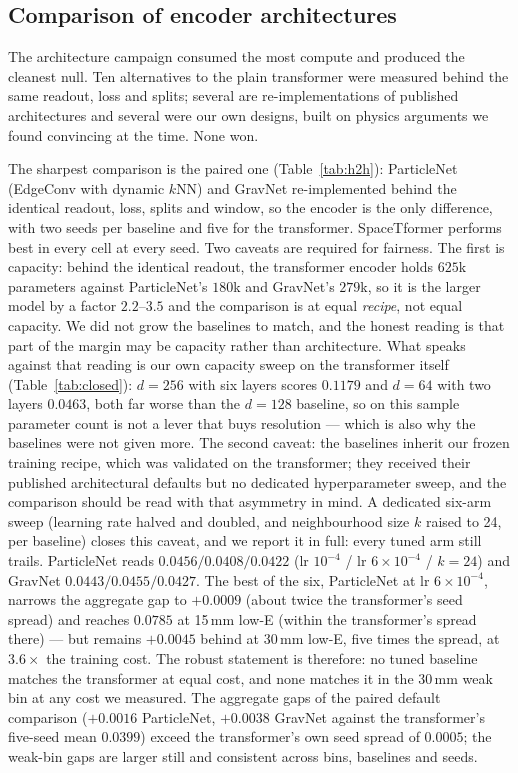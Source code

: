 \documentclass[11pt,a4paper]{article}
\begin{document}
\subsection{Comparison of encoder architectures}
\label{sec:encoders}

The architecture campaign consumed the most compute and produced the
cleanest null. Ten alternatives to the plain transformer were measured
behind the same readout, loss and splits; several are re-implementations of
published architectures and several were our own designs, built on physics
arguments we found convincing at the time. None won.

The sharpest comparison is the paired one (Table~\ref{tab:h2h}):
ParticleNet (EdgeConv with dynamic $k$NN) and GravNet re-implemented behind
the identical readout, loss, splits and window, so the encoder is the only
difference, with two seeds per baseline and five for the transformer.
SpaceTformer performs best in every cell at every seed. Two caveats are
required for fairness. The first is capacity: behind the identical readout,
the transformer encoder holds $625$k parameters against ParticleNet's $180$k
and GravNet's $279$k, so it is the larger model by a factor $2.2$--$3.5$ and
the comparison is at equal \emph{recipe}, not equal capacity. We did not
grow the baselines to match, and the honest reading is that part of the
margin may be capacity rather than architecture. What speaks against that
reading is our own capacity sweep on the transformer itself
(Table~\ref{tab:closed}): $d{=}256$ with six layers scores $0.1179$ and
$d{=}64$ with two layers $0.0463$, both far worse than the $d{=}128$
baseline, so on this sample parameter count is not a lever that buys
resolution --- which is also why the baselines were not given more.
The second caveat:
the baselines inherit our frozen training recipe, which was validated on
the transformer; they received their published architectural defaults but
no dedicated hyperparameter sweep, and the comparison should be read with
that asymmetry in mind. A dedicated six-arm sweep (learning rate halved and
doubled, and neighbourhood size $k$ raised to 24, per baseline) closes this
caveat, and we report it in full: every tuned arm still trails. ParticleNet
reads $0.0456 / 0.0408 / 0.0422$ (lr $10^{-4}$ / lr $6\times10^{-4}$ /
$k{=}24$) and GravNet $0.0443 / 0.0455 / 0.0427$. The best of the six,
ParticleNet at lr $6\times10^{-4}$, narrows the aggregate gap to $+0.0009$
(about twice the transformer's seed spread) and reaches $0.0785$ at 15\,mm
low-E (within the transformer's spread there) --- but remains $+0.0045$
behind at 30\,mm low-E, five times the spread, at $3.6\times$ the training
cost. The robust statement is therefore: no tuned baseline matches the
transformer at equal cost, and none matches it in the 30\,mm weak bin at
any cost we measured. The aggregate gaps of the paired default comparison
($+0.0016$ ParticleNet,
$+0.0038$ GravNet against the transformer's five-seed mean $0.0399$) exceed
the transformer's own seed spread of $0.0005$; the weak-bin gaps are larger
still and consistent across bins, baselines and seeds.
\end{document}
